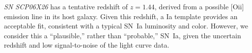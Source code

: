 
{\it SN SCP06X26} has a tentative redshift of $z=1.44$, derived from a
possible [O{\sc ii}] emission line in its host galaxy. Given this redshift,
a Ia template provides an acceptable fit, consistent with a typical
SN~Ia luminosity and color. However, we consider this a ``plausible,''
rather than ``probable,'' SN~Ia, given the uncertain redshift and low
signal-to-noise of the light curve data.


